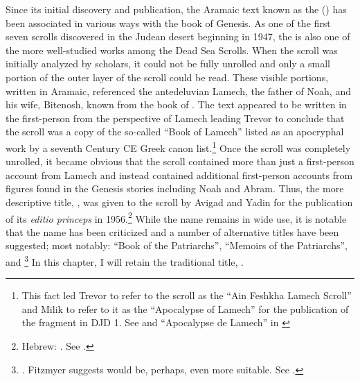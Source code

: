 

Since its initial discovery and publication, the Aramaic text known as the \ga () has been associated in various ways with the book of Genesis. As one of the first seven scrolls discovered in the Judean desert beginning in 1947, the \ga is also one of the more well-studied works among the Dead Sea Scrolls. When the scroll was initially analyzed by scholars, it could not be fully unrolled and only a small portion of the outer layer of the scroll could be read. These visible portions, written in Aramaic, referenced the antedeluvian Lamech, the father of Noah, and his wife, Bitenosh, known from the book of \jub. The text appeared to be written in the first-person from the perspective of Lamech leading Trevor to conclude that the scroll was a copy of the so-called ``Book of Lamech'' listed as an apocryphal work by a seventh Century CE Greek canon list.\footnote{This fact led Trevor to refer to the scroll as the ``Ain Feshkha Lamech Scroll'' and Milik to refer to it as the ``Apocalypse of Lamech'' for the publication of the fragment in DJD 1. See \cite[9--10]{trevor_basor1949} and ``Apocalypse de Lamech'' in \cite[86--87]{djd_1}} Once the scroll was completely unrolled, it became obvious that the scroll contained more than just a first-person account from Lamech and instead contained additional first-person accounts from figures found in the Genesis stories including Noah and Abram. Thus, the more descriptive title, , was given to the scroll by Avigad and Yadin for the publication of its \emph{editio princeps} in 1956.\footnote{Hebrew: . See \cite{avigad-yadin1956}.} While the name \ga remains in wide use, it is notable that the name has been criticized and a number of alternative titles have been suggested; most notably: ``Book of the Patriarchs''\autocite[Hebrew: . As suggested by Mazar in][379 n. 2]{flusser_ks1956}, ``Memoirs of the Patriarchs''\autocite[358]{gaster1976}, and \footnote{\cite[14 n. 1.]{milik1959}.  Fitzmyer suggests  would be, perhaps, even more suitable. See \cite[16]{fitzmyer2004}.} In this chapter, I will retain the traditional title, \ga.

